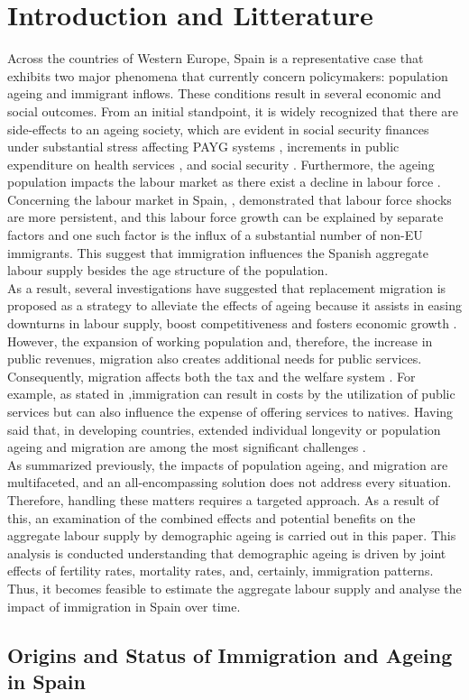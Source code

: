 \section{Introduction and Litterature}

Across the countries of Western Europe, Spain is a representative case that exhibits two major phenomena that currently concern policymakers: population ageing and immigrant inflows. These conditions result in several economic and social outcomes. From an initial standpoint, it is widely recognized that there are side-effects to an ageing society, which are evident in social security finances under substantial stress affecting PAYG systems \citep{ diaz2009delaying,boeri2024pay}, increments in public expenditure on health services \citep{cristea2020impact, aiyar2016impact, bijak2007population}, and social security \citep{failde2021perspective}. Furthermore, the ageing population impacts the labour market as there exist a decline in labour force \citep{maestas2023effect}. Concerning the labour market in Spain, \citep{casares2018labor}, demonstrated that labour force shocks are more persistent, and this labour force growth can be explained by separate factors and one such factor is the influx of a substantial number of non-EU immigrants. This suggest that immigration influences the Spanish aggregate labour supply besides the age structure of the population. \\

As a result, several investigations have suggested that replacement migration is proposed as a strategy to alleviate the effects of ageing because it assists in easing downturns in labour supply, boost competitiveness and fosters economic growth \citep{stepanek2022sectoral, okamoto2021immigration, UNATIONS}. However, the expansion of working population and, therefore, the increase in public revenues, migration also creates additional needs for public services. Consequently, migration affects both the tax and the welfare system \citep{fiorio2023migration, naumann2021population}. For example, as stated in \citep{ preston2014effect},immigration can result in costs by the utilization of public services but can also influence the expense of offering services to natives. Having said that, in developing countries, extended individual longevity or population ageing and migration are among the most significant challenges \citep{ciobanu2020intersections}. \\

As summarized previously, the impacts of population ageing, and migration are multifaceted, and an all-encompassing solution does not address every situation. Therefore, handling these matters requires a targeted approach. As a result of this, an examination of the combined effects and potential benefits on the aggregate labour supply by demographic ageing is carried out in this paper. This analysis is conducted understanding that demographic ageing is driven by joint effects of fertility rates, mortality rates, and, certainly, immigration patterns. Thus, it becomes feasible to estimate the aggregate labour supply and analyse the impact of immigration in Spain over time. 


\subsection{Origins and Status of Immigration and Ageing in Spain}

